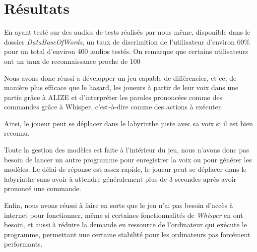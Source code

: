 \section{Résultats}
\label{sec:resultats}

En ayant testé sur des audios de tests réalisés par nous même, disponible dans le dossier \textit{DataBaseOfWords}, un taux de discrimition de l'utilisateur d'environ 60\% pour un total d'environ 400 audios testés. On remarque que certains utilisateurs ont un taux de reconnaissance proche de 100%

Nous avons donc réussi a développer un jeu capable de différencier, et ce, de manière plus efficace que le hasard, les joueurs à partir de leur voix dans une partie grâce à ALIZE et d'interpréter les paroles prononcées comme des commandes grâce à Whisper, c'est-à-dire comme des
actions à exécuter. 

Ainsi, le joueur peut se déplacer dans le labyrinthe juste avec sa voix si il est bien reconnu. 

Toute la gestion des modèles est faite à l'intérieur du jeu, nous n'avons donc pas besoin de lancer un autre programme pour enregistrer la voix ou pour générer les modèles. 
Le délai de réponse est assez rapide, le joueur peut se déplacer dans le labyrinthe sans avoir à attendre généralement plus de 3 secondes après avoir prononcé une commande. 

Enfin, nous avons réussi à faire en sorte que le jeu n'ai pas besoin d'accès à internet pour fonctionner, même si certaines fonctionnalités de \textit{Whisper} en ont besoin,
et aussi à réduire la demande en ressource de l'ordinateur qui exécute le programme, permettant une certaine stabilité pour les ordinateurs pas forcément performants.
